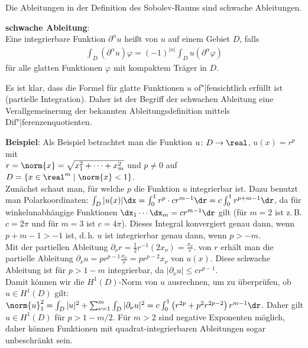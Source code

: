 \linie

Die Ableitungen in der Definition des Sobolev-Raums sind schwache Ableitungen.

\textbf{schwache Ableitung}:\\
Eine integrierbare Funktion $\partial^\alpha u$ heißt  von $u$ auf
einem Gebiet $D$, falls
\begin{align*}
    \int_D (\partial^\alpha u) \varphi = (-1)^{|\alpha|} \int_D u (\partial^\alpha \varphi)
\end{align*}
für alle glatten Funktionen $\varphi$ mit kompaktem Träger in $D$.

Es ist klar, dass die Formel für glatte Funktionen $u$ of"|fensichtlich erfüllt ist
(partielle Integration).
Daher ist der Begriff der schwachen Ableitung eine Verallgemeinerung der bekannten
Ableitungsdefinition mittels Dif"|ferenzenquotienten.

\linie

\textbf{Beispiel}:
Als Beispiel betrachtet man die Funktion $u\colon D \rightarrow \real$, $u(x) = r^p$ mit\\
$r = \norm{x} = \sqrt{x_1^2 + \dotsb + x_m^2}$ und $p \not= 0$ auf
$D = \{x \in \real^m \;|\; \norm{x} < 1\}$.\\
Zunächst schaut man, für welche $p$ die Funktion $u$ integrierbar ist.
Dazu benutzt man Polarkoordinaten:
$\int_D |u(x)|\dx = \int_0^1 r^p \cdot c r^{m-1} \dr
= c \int_0^1 r^{p+m-1} \dr$, da für winkelunabhängige Funktionen
$\dx_1 \dotsb \dx_m = c r^{m-1} \dr$
gilt (für $m = 2$ ist z.\,B. $c = 2\pi$ und für $m = 3$ ist $c = 4\pi$).
Dieses Integral konvergiert genau dann, wenn $p + m - 1 > -1$ ist, d.\,h.
$u$ ist integrierbar genau dann, wenn $p > -m$.\\
Mit der partiellen Ableitung
$\partial_\nu r = \frac{1}{2} r^{-1} (2x_\nu) = \frac{x_\nu}{r}$.
von $r$ erhält man die partielle Ableitung
$\partial_\nu u = p r^{p-1} \frac{x_\nu}{r} = pr^{p-2}x_\nu$ von $u(x)$.
Diese schwache Ableitung ist für $p > 1 - m$ integrierbar, da $|\partial_\nu u| \le cr^{p-1}$.\\
Damit können wir die $H^1(D)$-Norm von $u$ ausrechnen, um zu überprüfen, ob $u \in H^1(D)$ gilt:
$\norm{u}_1^2 = \int_D |u|^2 + \sum_{\nu=1}^m \int_D |\partial_\nu u|^2 =
c \int_0^1 \left(r^{2p} + p^2 r^{2p-2}\right) r^{m-1} \dr$.
Daher gilt $u \in H^1(D)$ für $p > 1 - m/2$.
Für $m > 2$ sind negative Exponenten möglich, daher können Funktionen mit quadrat-integrierbaren
Ableitungen sogar unbeschränkt sein.

